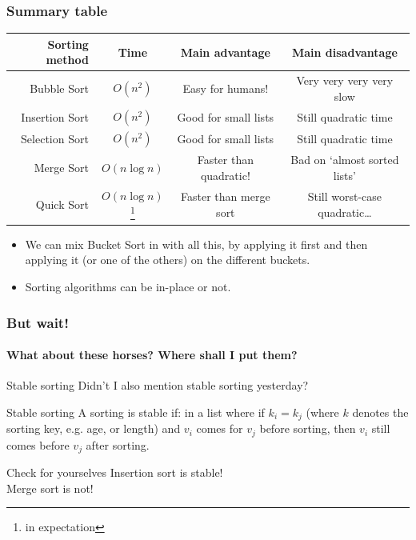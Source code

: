 \begin{frame}
	\frametitle{Summary table}
	\begin{tabular}{r | c | c | c}
		\small
		Sorting method & Time & Main advantage & Main disadvantage \\
		\midrule
		Bubble Sort & $O(n^2)$ & Easy for humans! &  Very very very very slow \\
		Insertion Sort & $O(n^2)$ & Good for small lists &  Still quadratic time \\
		Selection Sort & $O(n^2)$ & Good for small lists &  Still quadratic time \\
		Merge Sort & $O(n \log n)$ & Faster than quadratic! &  Bad on `almost sorted lists' \\
		Quick Sort & $O(n \log n)$\footnote{in expectation} & Faster than merge sort &  Still worst-case quadratic\dots \\
	\end{tabular}
	\begin{itemize}
		\item We can mix Bucket Sort in with all this, by applying it first and then applying it (or one of the others) on
			the different buckets.
		\item Sorting algorithms can be in-place or not.
	\end{itemize}
\end{frame}

\begin{frame}
	\frametitle{But wait!}
	\framesubtitle{What about these horses? Where shall I put them?}
	
	\begin{block}{Stable sorting}
		Didn't I also mention stable sorting yesterday?
	\end{block}
	\pause
		\begin{block}{Stable sorting}
			A sorting is stable if: in a list where if $k_i = k_j$ (where $k$ denotes the sorting key,
			e.g. age, or length) and $v_i$ comes for $v_j$ before sorting, then $v_i$ still comes before $v_j$ after sorting.
		\end{block}	
		\pause
			\begin{block}{Check for yourselves}
				Insertion sort is stable!\\
				Merge sort is not!
			\end{block}	
\end{frame}

